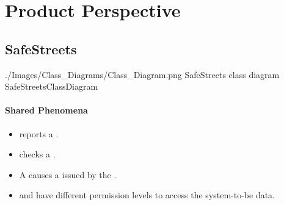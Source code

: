 \documentclass[../../RASD.tex]{subfiles}
\begin{document}
	
	\section{Product Perspective}
	\subsection{SafeStreets\label{sect:2.1.1}}
	
	\image {10cm} {./Images/Class_Diagrams/Class_Diagram.png} {SafeStreets class diagram} {SafeStreetsClassDiagram}
	
	
	\paragraph{Shared Phenomena}
	\begin{itemize}
		\item {} reports a .
		\item {} checks a .
		\item A  causes a  issued by the .
		\item {} and  have different permission levels to access the system-to-be data.
	\end{itemize}
		
\end{document}
